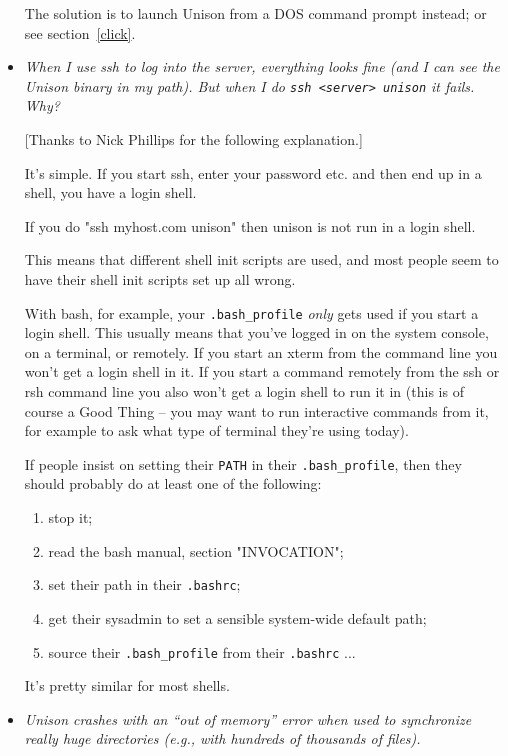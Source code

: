 \begin{itemize}
The solution is to launch Unison from a DOS command prompt instead;
or see section~\ref{click}.

\item {\em When I use ssh to log into the server, everything looks fine
  (and I can see the Unison binary in my path).
  But when I do {\tt ssh <server> unison} it fails.  Why?}


[Thanks to Nick Phillips    for the following explanation.]

It's simple. If you start ssh, enter your password etc. and then end up
in a shell, you have a login shell.

If you do "ssh myhost.com unison" then unison is not run in a login shell.

This means that different shell init scripts are used, and most people seem
to have their shell init scripts set up all wrong.

With bash, for example, your \verb|.bash_profile| {\em only} gets used if
you start 
a login shell. This usually means that you've logged in on the system console,
on a terminal, or remotely. If you start an xterm from the command line
you won't get a login shell in it. If you start a command remotely from
the ssh or rsh command line you also won't get a login shell to run it in
(this is of course a Good Thing -- you may want to run interactive commands
from it, for example to ask what type of terminal they're using today).

If people insist on setting their \verb|PATH| in their
\verb|.bash_profile|, then they 
should probably do at least one of the following:
\begin{enumerate}
\item 
stop it;
\item 
read the bash manual, section "INVOCATION";
\item 
set their path in their \verb|.bashrc|;
\item 
get their sysadmin to set a sensible system-wide default path;
\item 
 source their \verb|.bash_profile| from their \verb|.bashrc| ...
\end{enumerate}
It's pretty similar for most shells.

\item {\em Unison crashes with an ``out of memory'' error when used to
  synchronize really huge directories (e.g., with hundreds of thousands
  of files).}


\end{itemize}
